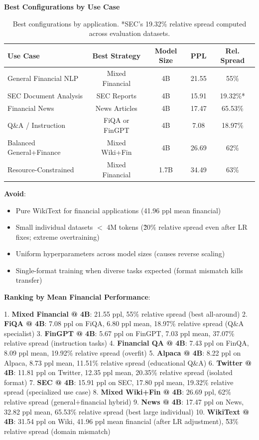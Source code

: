 \textbf{Best Configurations by Use Case}

\begin{table}[h]
\centering
\small
\begin{tabular}{lcccc}
\toprule
\textbf{Use Case} & \textbf{Best Strategy} & \textbf{Model Size} & \textbf{PPL} & \textbf{Rel. Spread} \\
\midrule
General Financial NLP & Mixed Financial & 4B & 21.55 & 55\% \\
SEC Document Analysis & SEC Reports & 4B & 15.91 & 19.32\%* \\
Financial News & News Articles & 4B & 17.47 & 65.53\% \\
Q\&A / Instruction & FiQA or FinGPT & 4B & 7.08 & 18.97\% \\
Balanced General+Finance & Mixed Wiki+Fin & 4B & 26.69 & 62\% \\
Resource-Constrained & Mixed Financial & 1.7B & 34.49 & 63\% \\
\bottomrule
\end{tabular}
\caption[Best Configurations by Application]{Best configurations by application. *SEC's 19.32\% relative spread computed across evaluation datasets.}
\end{table}

\textbf{Avoid}:
\begin{itemize}
\item Pure WikiText for financial applications (41.96 ppl mean financial)
\item Small individual datasets $<$ 4M tokens (\~20\% relative spread even after LR fixes; extreme overtraining)
\item Uniform hyperparameters across model sizes (causes reverse scaling)
\item Single-format training when diverse tasks expected (format mismatch kills transfer)
\end{itemize}

\textbf{Ranking by Mean Financial Performance}:

1. \textbf{Mixed Financial @ 4B}: 21.55 ppl, 55\% relative spread (best all-around)
2. \textbf{FiQA @ 4B}: 7.08 ppl on FiQA, 6.80 ppl mean, 18.97\% relative spread (Q\&A specialist)
3. \textbf{FinGPT @ 4B}: 5.67 ppl on FinGPT, 7.03 ppl mean, 37.07\% relative spread (instruction tasks)
4. \textbf{Financial QA @ 4B}: 7.43 ppl on FinQA, 8.09 ppl mean, 19.92\% relative spread (overfit)
5. \textbf{Alpaca @ 4B}: 8.22 ppl on Alpaca, 8.73 ppl mean, 11.51\% relative spread (educational Q\&A)
6. \textbf{Twitter @ 4B}: 11.81 ppl on Twitter, 12.35 ppl mean, 20.35\% relative spread (isolated format)
7. \textbf{SEC @ 4B}: 15.91 ppl on SEC, 17.80 ppl mean, 19.32\% relative spread (specialized use case)
8. \textbf{Mixed Wiki+Fin @ 4B}: 26.69 ppl, 62\% relative spread (general+financial hybrid)
9. \textbf{News @ 4B}: 17.47 ppl on News, 32.82 ppl mean, 65.53\% relative spread (best large individual)
10. \textbf{WikiText @ 4B}: 31.54 ppl on Wiki, 41.96 ppl mean financial (after LR adjustment), \~53\% relative spread (domain mismatch)

